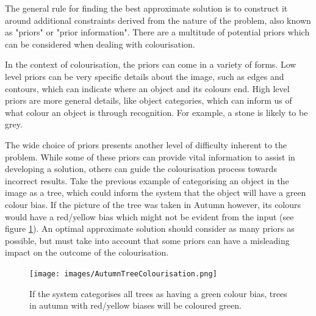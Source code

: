 \documentclass{l4proj}
\begin{document}
The general rule for finding the best approximate solution is to construct it around additional constraints derived from the nature of the problem, also known as "priors" or "prior information"\cite{Inverses}. There are a multitude of potential priors which can be considered when dealing with colourisation. 

In the context of colourisation, the priors can come in a variety of forms. Low level priors can be very specific details about the image, such as edges and contours, which can indicate where an object and its colours end. High level priors are more general details, like object categories, which can inform us of what colour an object is through recognition. For example, a stone is likely to be grey.


The wide choice of priors presents another level of difficulty inherent to the problem. While some of these priors can provide vital information to assist in developing a solution, others can guide the colourisation process towards incorrect results. Take the previous example of categorising an object in the image as a tree, which could inform the system that the object will have a green colour bias. If the picture of the tree was taken in Autumn however, its colours would have a red/yellow bias which might not be evident from the input (see figure \ref{fig:treecolourisation}). An optimal approximate solution should consider as many priors as possible, but must take into account that some priors can have a misleading impact on the outcome of the colourisation.

\begin{figure}[H]
    \centering
    \texttt{[image: images/AutumnTreeColourisation.png]}    

    \caption{If the system categorises all trees as having a green colour bias, trees in autumn with red/yellow biases will be coloured green.}

    \label{fig:treecolourisation} 
\end{figure}

\end{document}
